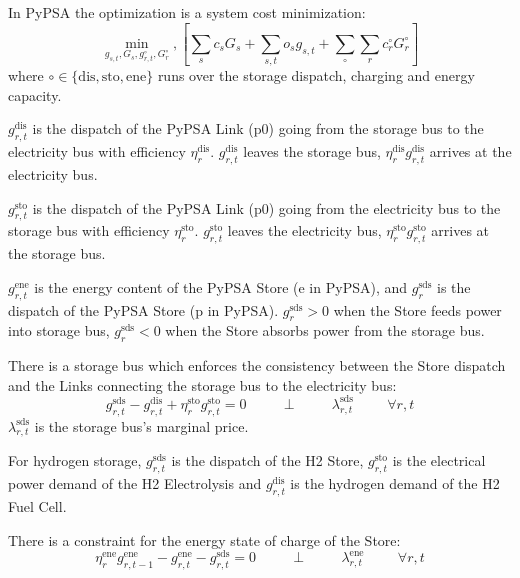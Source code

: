 \documentclass[final,3p]{elsarticle}
\begin{document}
In PyPSA the optimization is a system cost minimization:
\begin{equation}
  \min_{g_{s,t}, G_s,g^{\circ}_{r,t},G^{\circ}_{r}},\left[ \sum_s c_s G_s + \sum_{s,t} o_{s} g_{s,t} +\sum_{\circ}\sum_r c^{\circ}_r G^{\circ}_r\right]  \label{eq:objpypsa}
\end{equation}
where $\circ\in \{\textrm{dis},\textrm{sto},\textrm{ene}\}$ runs over the
storage dispatch, charging and energy capacity.

$g^{\textrm{dis}}_{r,t}$ is the dispatch of the PyPSA Link (p0) going from the
storage bus to the electricity bus with efficiency $\eta^{\textrm{dis}}_r$.
$g^{\textrm{dis}}_{r,t}$ leaves the storage bus,
$\eta^{\textrm{dis}}_rg^{\textrm{dis}}_{r,t}$ arrives at the electricity bus.

$g^{\textrm{sto}}_{r,t}$ is the dispatch of the PyPSA Link (p0) going from the
electricity bus to the storage bus with efficiency $\eta^{\textrm{sto}}_r$.
$g^{\textrm{sto}}_{r,t}$ leaves the electricity bus,
$\eta^{\textrm{sto}}_rg^{\textrm{sto}}_{r,t}$ arrives at the storage bus.

$g^{\textrm{ene}}_{r,t}$ is the energy content of the PyPSA Store (e in PyPSA),
and $g^{\textrm{sds}}_r$ is the dispatch of the PyPSA Store (p in PyPSA).
$g^{\textrm{sds}}_r > 0$ when the Store feeds power into storage bus,
$g^{\textrm{sds}}_r < 0$ when the Store absorbs power from the storage bus.

There is a storage bus which enforces the consistency between the Store dispatch
and the Links connecting the storage bus to the electricity bus:
\begin{equation}
  g^{\textrm{sds}}_{r,t} - g^{\textrm{dis}}_{r,t} + \eta^{\textrm{sto}}_r g^{\textrm{sto}}_{r,t} = 0  \hspace{1cm}\perp \hspace{1cm} \lambda^{\textrm{sds}}_{r,t} \hspace{1cm} \forall r,t \label{eq:biddingconstraint}
\end{equation}
$\lambda^{\textrm{sds}}_{r,t}$ is the storage bus's marginal price.

For hydrogen storage, $g^{\textrm{sds}}_{r,t}$ is the dispatch of the H2 Store,
$g^{\textrm{sto}}_{r,t}$ is the electrical power demand of the H2 Electrolysis
and $g^{\textrm{dis}}_{r,t}$ is the hydrogen demand of the H2 Fuel Cell.

There is a constraint for the energy state of charge of the Store:
\begin{equation}
  \eta^{\textrm{ene}}_r g^{\textrm{ene}}_{r,t-1} - g^{\textrm{ene}}_{r,t} - g^{\textrm{sds}}_{r,t} = 0  \hspace{1cm}\perp \hspace{1cm} \lambda^{\textrm{ene}}_{r,t} \hspace{1cm} \forall r,t  \label{eq:soc3}
\end{equation}
\end{document}
